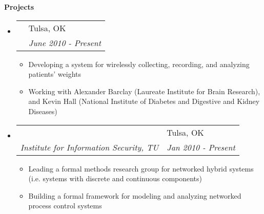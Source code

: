 \documentclass[letterpaper,11pt]{article}
\makeatletter
\newcommand{\resitem}[1]{\item \parbox[t]{4.6in}{#1} \vspace{-2pt}}
\newcommand{\resheading}[1]{{\large \colorbox{mygrey}{\begin{minipage}
    {\textwidth}{\textbf{#1 \vphantom{p\^{E}}}}\end{minipage}}}}
\newcommand{\ressubheading}[4]{
\begin{tabular*}{6.5in}[t]{l@{\extracolsep{\fill}}l}
		\textbf{\parbox[t]{4.5in}{\raggedright #1 }} & \parbox[b]{1.5in}{#2} \\
		\textit{#3} & \textit{#4} \\
\end{tabular*}\vspace{-6pt}}
\makeatother
\begin{document}
\resheading{Projects}

\begin{itemize}
\item
	\ressubheading{GSM Scale}{Tulsa, OK}{}{June 2010 - Present}
	\begin{itemize}
		\resitem{Developing a system for wirelessly collecting, recording, and analyzing patients' weights}
		\resitem{Working with Alexander Barclay (Laureate Institute for Brain Research), and Kevin Hall (National Institute of Diabetes and Digestive and Kidney Diseases)}
	\end{itemize}

\item
	\ressubheading{Cyber-physical Systems}{Tulsa, OK}{Institute for Information Security, TU}{Jan 2010 - Present}
	\begin{itemize}
		\resitem{Leading a formal methods research group for networked hybrid systems (i.e. systems with discrete and continuous components)}
		\resitem{Building a formal framework for modeling and analyzing networked process control systems}
	\end{itemize}




\end{itemize}
\end{document}
